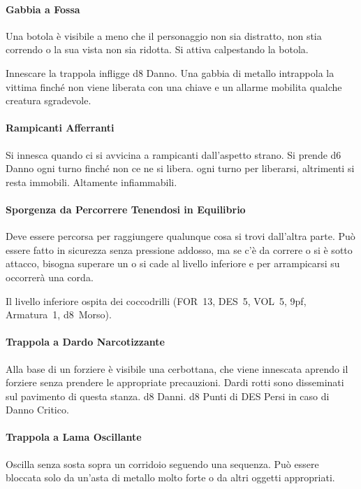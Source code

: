 \documentclass[itdr]{subfiles}
\begin{document}
\vfill
\paragraph{Gabbia a Fossa}
Una botola è visibile a meno che il personaggio non sia distratto, non stia correndo o la sua vista non sia ridotta. Si attiva calpestando la botola.

Innescare la trappola infligge d8 Danno. Una gabbia di metallo intrappola la vittima finché non viene liberata con una chiave e un allarme mobilita qualche creatura sgradevole.

\vfill
\paragraph{Rampicanti Afferranti}
Si innesca quando ci si avvicina a rampicanti dall'aspetto strano. Si prende d6 Danno ogni turno finché non ce ne si libera.  ogni turno per liberarsi, altrimenti si resta immobili. Altamente infiammabili.

\vfill
\paragraph{Sporgenza da Percorrere Tenendosi in Equilibrio}
Deve essere percorsa per raggiungere qualunque cosa si trovi dall'altra parte. Può essere fatto in sicurezza senza pressione addosso, ma se c'è da correre o si è sotto attacco, bisogna superare un  o si cade al livello inferiore e per arrampicarsi su occorrerà una corda.

Il livello inferiore ospita dei coccodrilli (FOR~13, DES~5, VOL~5, 9pf, Armatura~1, d8~Morso).

\vfill
\paragraph{Trappola a Dardo Narcotizzante}
Alla base di un forziere è visibile una cerbottana, che viene innescata aprendo il forziere senza prendere le appropriate precauzioni. Dardi rotti sono disseminati sul pavimento di questa stanza.
d8 Danni. d8 Punti di DES Persi in caso di Danno Critico.

\vfill
\paragraph{Trappola a Lama Oscillante}
Oscilla senza sosta sopra un corridoio seguendo una sequenza. Può essere bloccata solo da un'asta di metallo molto forte o da altri oggetti appropriati.
\end{document}
